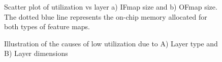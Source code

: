 \begin{figure}
    \centering
    \hspace{0.1cm} 
    \caption{Scatter plot of utilization vs layer a) IFmap size and b) OFmap size. The dotted blue line represents the on-chip memory allocated for both types of feature maps.}
    \label{fig:scatter_plot_util_vs_fmap}
\end{figure}

\begin{figure}
    \centering
    \hspace{0.1cm} 
    \caption{Illustration of the causes of low utilization due to A) Layer type and B) Layer dimensions}
    \label{fig:cause_of_low_util}
\end{figure}

